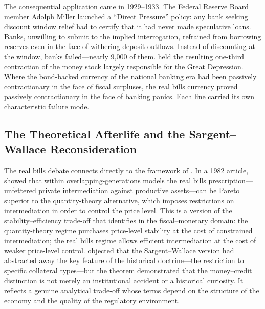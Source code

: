 \documentclass[12pt]{article}
\begin{document}
The consequential application came in 1929--1933.  The Federal
Reserve Board member Adolph Miller launched a ``Direct Pressure'' policy:
any bank seeking discount window relief had to certify that it had never
made speculative loans.  Banks, unwilling to submit to the implied
interrogation, refrained from borrowing reserves even in the face of
withering deposit outflows.  Instead of discounting at the window, banks
failed---nearly 9{,}000 of them.  \citet{FriedmanSchwartz1963} held
the resulting one-third contraction of the money stock largely
responsible for the Great Depression.  Where the bond-backed currency
of the national banking era had been passively contractionary in the
face of fiscal surpluses, the real bills currency proved passively
contractionary in the face of banking panics.  Each line carried its
own characteristic failure mode.

\subsection{The Theoretical Afterlife and the Sargent--Wallace
            Reconsideration}

The real bills debate connects directly to the framework of
\citet{Sargent2011}.  In a 1982 article, \citet{SargentWallace1982}
showed that within overlapping-generations models the real bills
prescription---unfettered private intermediation against productive
assets---can be Pareto superior to the quantity-theory alternative,
which imposes restrictions on intermediation in order to control the
price level.  This is a version of the stability--efficiency trade-off
that \citet{Sargent2011} identifies in the fiscal--monetary domain:
the quantity-theory regime purchases price-level stability at the cost
of constrained intermediation; the real bills regime allows efficient
intermediation at the cost of weaker price-level control.
\citet{Laidler1984} objected that the Sargent--Wallace version had
abstracted away the key feature of the historical doctrine---the
restriction to specific collateral types---but the theorem demonstrated
that the money--credit distinction is not merely an institutional
accident or a historical curiosity.  It reflects a genuine analytical
trade-off whose terms depend on the structure of the economy and the
quality of the regulatory environment.
\end{document}
